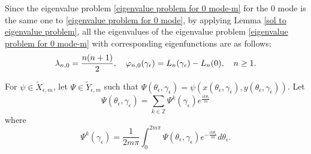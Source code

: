 \documentclass[1 [leqno, 11pt]{amsart}
\numberwithin{equation}{section}
\let\ep=\epsilon
\def\gep{\gamma_\epsilon}
\begin{document}
\begin{CJK*}{GBK}{song}
Since the eigenvalue problem \eqref{eigenvalue problem for 0 mode-m} for the $0$ mode  is the same one to \eqref{eigenvalue problem for 0 mode}, by applying Lemma
\ref{sol to eigenvalue problem},
all the eigenvalues  of the eigenvalue problem \eqref{eigenvalue problem for 0 mode-m} with corresponding eigenfunctions are as follows:
\begin{align}\label{0 mode-eigenvalue-eigenfunction-m}
\lambda_{n,0}={n(n+1)\over2},\quad\varphi_{n,0}(\gamma_\ep)= L_{n}(\gamma_\ep)-L_{n}(0),\quad n\geq1.
\end{align}







For  $\psi \in \tilde{X}_{\ep,m}$, let $\Psi \in \tilde{Y}_{\ep,m}$ such that $\Psi(\theta_\ep, \gep) = \psi(x(\theta_\ep, \gep), y(\theta_\ep, \gep))$. Let
$$\Psi(\theta_\ep, \gep) =  \sum_{k \in \mathbb{Z}} \Psi^k(\gep) e^{\frac{ik\theta_\ep}{m}}$$
where
$$\Psi^k(\gep) = \frac{1}{2m\pi} \int_0^{2m\pi} \Psi(\theta_\ep, \gep) e^{-\frac{ik\theta_\ep}{m}} d \theta_\ep.$$
\fi


\end{CJK*}
\end{document}
